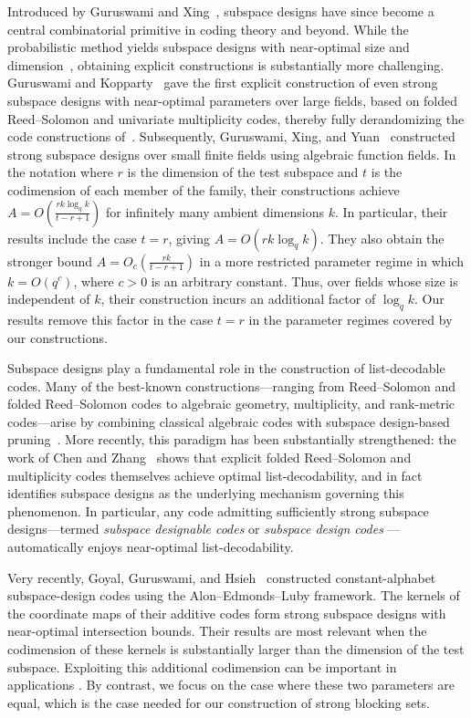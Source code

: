\documentclass[11pt]{article}
\begin{document}
Introduced by Guruswami and Xing~\cite{guruswami2013list}, subspace designs have since become a central combinatorial primitive in coding theory and beyond. While the probabilistic method yields subspace designs with near-optimal size and dimension~\cite{guruswami2013list,guruswami2016explicit}, obtaining explicit constructions is substantially more challenging. Guruswami and Kopparty~\cite{guruswami2016explicit} gave the first explicit construction of even strong subspace designs with near-optimal parameters over large fields, based on folded Reed–Solomon and univariate multiplicity codes, thereby fully derandomizing the code constructions of~\cite{guruswami2013list}. Subsequently, Guruswami, Xing, and Yuan~\cite{guruswami2018subspace} constructed strong subspace designs over small finite fields using algebraic function
fields. In the notation where $r$ is the dimension of the test subspace and $t$ is the codimension of each member of the family, their constructions achieve
$A =
O\left(
\frac{rk\log_q k}{t-r+1}
\right)$
for infinitely many ambient dimensions $k$. In particular, their results
include the case $t=r$, giving $A=O(rk\log_q k)$.
They also obtain the stronger bound
$A =
O_c\left(
\frac{rk}{t-r+1}
\right)$
in a more restricted parameter regime in which $k=O(q^c)$, where $c>0$ is an arbitrary constant. Thus, over
fields whose size is independent of $k$, their construction incurs an
additional factor of $\log_q k$. Our results remove this factor in the
case $t=r$ in the parameter regimes covered by our constructions.

Subspace designs play a fundamental role in the construction of list-decodable codes. Many of the best-known constructions---ranging from Reed–Solomon and folded Reed–Solomon codes to algebraic geometry, multiplicity, and rank-metric codes---arise by combining classical algebraic codes with subspace design-based pruning~\cite{guruswami2013list,guruswami2016explicit,GX22}. More recently, this paradigm has been substantially strengthened: the work of Chen and Zhang~\cite{chen2025explicit} shows that explicit folded Reed–Solomon and multiplicity codes themselves achieve optimal list-decodability, and in fact identifies subspace designs as the underlying mechanism governing this phenomenon. In particular, any code admitting sufficiently strong subspace designs---termed \emph{subspace designable codes} \cite{chen2025explicit} or \emph{subspace design codes} \cite{Goyal2025OptimalPG}---automatically enjoys near-optimal list-decodability.

Very recently, Goyal, Guruswami, and Hsieh~\cite{GGH26} constructed constant-alphabet subspace-design codes using the Alon--Edmonds--Luby framework. The kernels of the coordinate maps of their additive codes form strong subspace designs with near-optimal intersection bounds. Their results are most relevant when the codimension of these kernels is substantially larger than the dimension of the test subspace. Exploiting this additional codimension can be important in applications \cite{chen2025explicit,Goyal2025OptimalPG,GGH26,CGGRT26}.
By contrast, we focus on the case where these two parameters are equal, which is the case needed for our construction of strong blocking sets.
\end{document}
